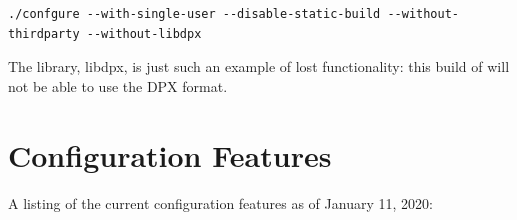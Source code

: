 \begin{lstlisting}[numbers=none]
./confgure --with-single-user --disable-static-build --without-thirdparty --without-libdpx
\end{lstlisting}

The library, libdpx, is just such an example of lost functionality: this build of \CGG{} will not be able to use the DPX format.

\section{Configuration Features}
\label{sec:configuration_features}

A listing of the current configuration features as of January 11, 2020:

\begingroup
    \fontsize{10pt}{12pt}\selectfont
